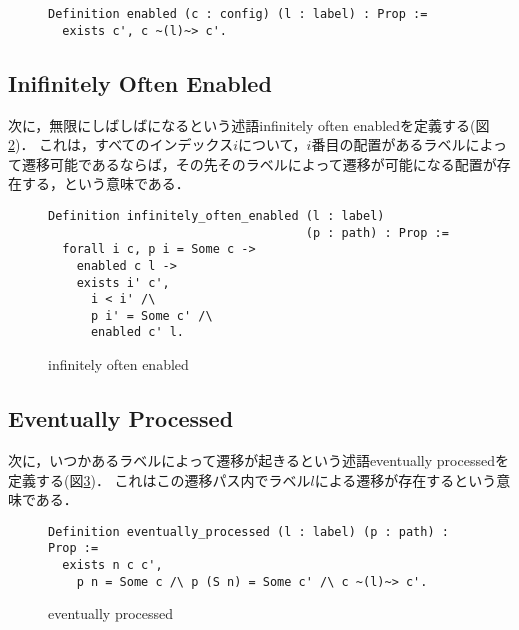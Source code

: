 \begin{figure}[tp]
\begin{lstlisting}
Definition enabled (c : config) (l : label) : Prop :=
  exists c', c ~(l)~> c'.
\end{lstlisting}
  \label{code:formalization:enabled}
  \caption{\enabled}
\end{figure}

\subsection{Inifinitely Often Enabled}
次に，無限にしばしば\enabled になるという述語infinitely often enabledを定義する(図\ref{code:proof:infinitely-often-enabled})．
これは，すべてのインデックス$i$について，$i$番目の配置があるラベルによって遷移可能であるならば，その先そのラベルによって遷移が可能になる配置が存在する，という意味である．

\begin{figure}
\begin{lstlisting}
Definition infinitely_often_enabled (l : label)
                                    (p : path) : Prop :=
  forall i c, p i = Some c ->
    enabled c l ->
    exists i' c',
      i < i' /\
      p i' = Some c' /\
      enabled c' l.
\end{lstlisting}
\label{code:proof:infinitely-often-enabled}
\caption{infinitely often enabled}
\end{figure}

\subsection{Eventually Processed}
次に，いつかあるラベルによって遷移が起きるという述語eventually processedを定義する(図\ref{code:proof:eventually-processed})．
これはこの遷移パス内でラベル$l$による遷移が存在するという意味である．

\begin{figure}
\begin{lstlisting}
Definition eventually_processed (l : label) (p : path) : Prop :=
  exists n c c',
    p n = Some c /\ p (S n) = Some c' /\ c ~(l)~> c'.
\end{lstlisting}
\label{code:proof:eventually-processed}
\caption{eventually processed}
\end{figure}


